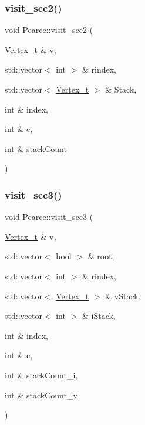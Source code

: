 \subsubsection{\texorpdfstring{visit\+\_\+scc2()}{visit\_scc2()}}
{\footnotesize\ttfamily void Pearce\+::visit\+\_\+scc2 (\begin{DoxyParamCaption}\item[{\hyperlink{class_graph_component_ae67114a6ce5a001dc35e1996e1b45aa0_ae67114a6ce5a001dc35e1996e1b45aa0}{Vertex\+\_\+t} \&}]{v,  }\item[{std\+::vector$<$ int $>$ \&}]{rindex,  }\item[{std\+::vector$<$ \hyperlink{class_graph_component_ae67114a6ce5a001dc35e1996e1b45aa0_ae67114a6ce5a001dc35e1996e1b45aa0}{Vertex\+\_\+t} $>$ \&}]{Stack,  }\item[{int \&}]{index,  }\item[{int \&}]{c,  }\item[{int \&}]{stack\+Count }\end{DoxyParamCaption})}

\mbox{\label{class_pearce_a70800d4564b36fb64762d3a78f1f67d8_a70800d4564b36fb64762d3a78f1f67d8}} 
\subsubsection{\texorpdfstring{visit\+\_\+scc3()}{visit\_scc3()}}
{\footnotesize\ttfamily void Pearce\+::visit\+\_\+scc3 (\begin{DoxyParamCaption}\item[{\hyperlink{class_graph_component_ae67114a6ce5a001dc35e1996e1b45aa0_ae67114a6ce5a001dc35e1996e1b45aa0}{Vertex\+\_\+t} \&}]{v,  }\item[{std\+::vector$<$ bool $>$ \&}]{root,  }\item[{std\+::vector$<$ int $>$ \&}]{rindex,  }\item[{std\+::vector$<$ \hyperlink{class_graph_component_ae67114a6ce5a001dc35e1996e1b45aa0_ae67114a6ce5a001dc35e1996e1b45aa0}{Vertex\+\_\+t} $>$ \&}]{v\+Stack,  }\item[{std\+::vector$<$ int $>$ \&}]{i\+Stack,  }\item[{int \&}]{index,  }\item[{int \&}]{c,  }\item[{int \&}]{stack\+Count\+\_\+i,  }\item[{int \&}]{stack\+Count\+\_\+v }\end{DoxyParamCaption})}

